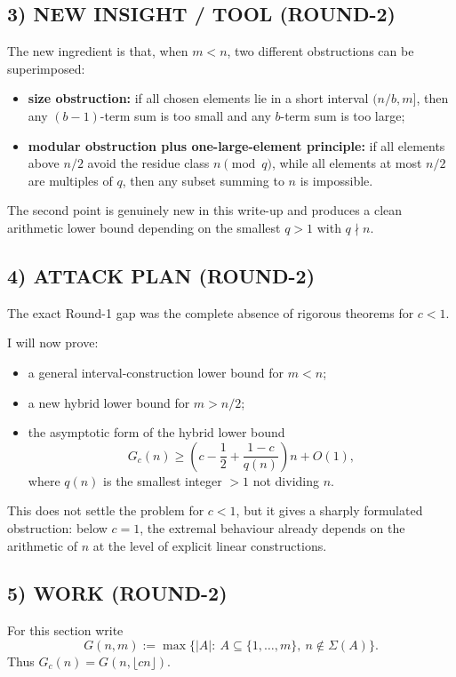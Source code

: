 \subsection*{3) NEW INSIGHT / TOOL (ROUND-2)}
The new ingredient is that, when $m<n$, two different obstructions can be superimposed:

\begin{itemize}
\item \textbf{size obstruction:} if all chosen elements lie in a short interval $(n/b,m]$, then any $(b-1)$-term sum is too small and any $b$-term sum is too large;
\item \textbf{modular obstruction plus one-large-element principle:} if all elements above $n/2$ avoid the residue class $n \pmod q$, while all elements at most $n/2$ are multiples of $q$, then any subset summing to $n$ is impossible.
\end{itemize}

The second point is genuinely new in this write-up and produces a clean arithmetic lower bound depending on the smallest $q>1$ with $q\nmid n$.

\subsection*{4) ATTACK PLAN (ROUND-2)}
The exact Round-1 gap was the complete absence of rigorous theorems for $c<1$.

I will now prove:

\begin{itemize}
\item[(i)] a general interval-construction lower bound for $m<n$;
\item[(ii)] a new hybrid lower bound for $m>n/2$;
\item[(iii)] the asymptotic form of the hybrid lower bound
\[
G_c(n)\ge \left(c-\frac12+\frac{1-c}{q(n)}\right)n+O(1),
\]
where $q(n)$ is the smallest integer $>1$ not dividing $n$.
\end{itemize}

This does not settle the problem for $c<1$, but it gives a sharply formulated obstruction: below $c=1$, the extremal behaviour already depends on the arithmetic of $n$ at the level of explicit linear constructions.

\subsection*{5) WORK (ROUND-2)}

For this section write
\[
G(n,m):=\max\{|A|:\ A\subseteq \{1,\dots,m\},\ n\notin \Sigma(A)\}.
\]
Thus $G_c(n)=G(n,\lfloor cn\rfloor)$.

